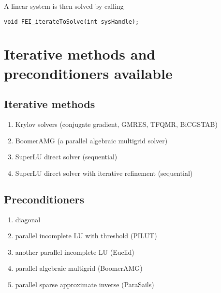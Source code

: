 A linear system is then solved by calling 
\begin{display}
\begin{verbatim}
void FEI_iterateToSolve(int sysHandle);
\end{verbatim}
\end{display}


\section{Iterative methods and preconditioners available}


\subsection{Iterative methods}

\begin{enumerate}
\item Krylov solvers (conjugate gradient, GMRES, TFQMR, BiCGSTAB)
\item BoomerAMG (a parallel algebraic multigrid solver)
\item SuperLU direct solver (sequential)
\item SuperLU direct solver with iterative refinement (sequential)
\end{enumerate}


\subsection{Preconditioners}

\begin{enumerate}
\item diagonal
\item parallel incomplete LU with threshold (PILUT)
\item another parallel incomplete LU (Euclid)
\item parallel algebraic multigrid (BoomerAMG)
\item parallel sparse approximate inverse (ParaSails)
\end{enumerate}



